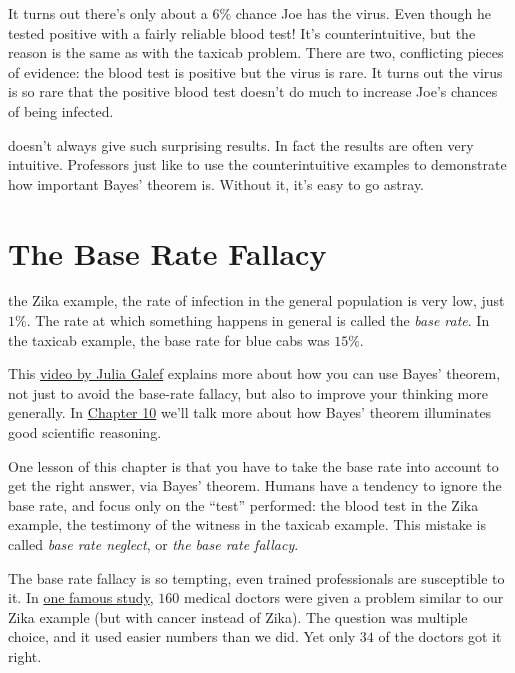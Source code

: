 \documentclass[justified]{tufte-book}
\theoremstyle{definition}
\theoremstyle{definition}
\theoremstyle{definition}
\theoremstyle{remark}
\begin{document}
It turns out there's only about a \(6\%\) chance Joe has the virus. Even
though he tested positive with a fairly reliable blood test! It's
counterintuitive, but the reason is the same as with the taxicab
problem. There are two, conflicting pieces of evidence: the blood test
is positive but the virus is rare. It turns out the virus is so rare
that the positive blood test doesn't do much to increase Joe's chances
of being infected.

 doesn't always give such surprising results.
In fact the results are often very intuitive. Professors just like to
use the counterintuitive examples to demonstrate how important Bayes'
theorem is. Without it, it's easy to go astray.

\hypertarget{baserate}{%
\section{The Base Rate Fallacy}\label{baserate}}

 the Zika example, the rate of infection in the general
population is very low, just \(1\%\). The rate at which something
happens in general is called the \emph{base rate}. In the taxicab
example, the base rate for blue cabs was \(15\%\).

\begin{marginfigure}
This \href{https://www.youtube.com/watch?v=BrK7X_XlGB8}{video by Julia
Galef} explains more about how you can use Bayes' theorem, not just to
avoid the base-rate fallacy, but also to improve your thinking more
generally. In \protect\hyperlink{bayesibe}{Chapter 10} we'll talk more
about how Bayes' theorem illuminates good scientific reasoning.
\end{marginfigure}

One lesson of this chapter is that you have to take the base rate into
account to get the right answer, via Bayes' theorem. Humans have a
tendency to ignore the base rate, and focus only on the ``test''
performed: the blood test in the Zika example, the testimony of the
witness in the taxicab example. This mistake is called \emph{base rate
neglect}, or \emph{the base rate fallacy}.

The base rate fallacy is so tempting, even trained professionals are
susceptible to it. In
\href{https://www.stat.berkeley.edu/~aldous/157/Papers/health_stats.pdf}{one
famous study}, \(160\) medical doctors were given a problem similar to
our Zika example (but with cancer instead of Zika). The question was
multiple choice, and it used easier numbers than we did. Yet only \(34\)
of the doctors got it right.
\end{document}
